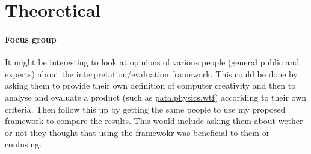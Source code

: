 

\section{Theoretical}

\paragraph{Focus group}
It might be interesting to look at opinions of various people (general public and experts) about the interpretation/evaluation framework. This could be done by asking them to provide their own definition of computer creativity and then to analyse and evaluate a product (such as \url{pata.physics.wtf}) accoriding to their own criteria. Then follow this up by getting the same people to use my proposed framework to compare the results. This would include asking them about wether or not they thought that using the framewokr was beneficial to them or confusing.

\paragraph{}



\stopcontents[chapters]
